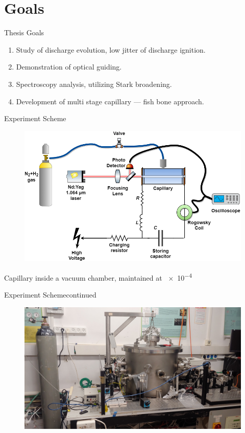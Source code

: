 \documentclass[draft]{beamer}
\begin{document}
  \section{Goals}
  \begin{frame}{Thesis Goals}
    \begin{enumerate}
      \item Study of discharge evolution, low jitter of discharge ignition.
      \item Demonstration of optical guiding.
      \item Spectroscopy analysis, utilizing Stark broadening.
      \item Development of multi stage capillary --- fish bone approach.
    \end{enumerate}
  \end{frame}
  \begin{frame}{Experiment Scheme}
    \begin{figure}
      \includegraphics[width=\textwidth]{figures/methods/Laser-based ignition scheme.png}
    \end{figure}
    Capillary inside a vacuum chamber, maintained at \SI{e-4}{\torr}
  \end{frame}
  \begin{frame}{Experiment Scheme}{continued}
    \begin{figure}
      \includegraphics[width=\textwidth]{figures/methods/system_picture.jpg}
    \end{figure}
  \end{frame}
\end{document}
